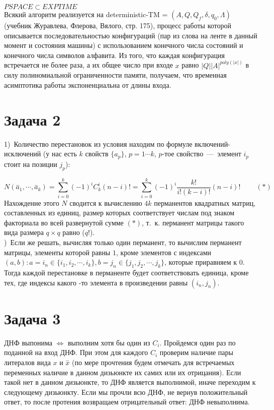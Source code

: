 \documentclass[a4paper,12pt]{article} %
\begin{document}
$PSPACE \subset EXPTIME$\\
Всякий алгоритм реализуется на deterministic-TM = $(A, Q, Q_f, \delta, q_0, \Lambda)$ (учебник Журавлева, Флерова, Вялого, стр. 175), процесс работы которой описывается последовательностью конфигураций (пар из слова на ленте в данный момент и состояния машины) с использованием конечного числа состояний и конечного числа символов алфавита. Из того, что каждая конфигурация встречается не более раза, а их общее число при входе $ x$ равно $ |Q||A|^{poly(|x|)}$ в силу полиномиальной ограниченности памяти, получаем, что временная асимптотика работы экспоненциальна от длины входа.\\

\section*{Задача 2}
1)~Количество перестановок из условия находим по формуле включений-исключений (у нас есть $k$ свойств $\{a_p\}$, $p = 1 \cdots k$, $p$-тое свойство~---~элемент $i_p$ стоит на позиции $j_p$):

\[
N(\overset{-}a_1,\cdots,\overset{-}a_k) = \sum_{i=0}^{k}{(-1)^iC_k^i(n-i)!} = \sum_{i=0}^{k}{(-1)^i\dfrac{k!}{i!(k-i)!}(n-i)! }~~~~~~~~~~(*)
\]
Нахождение этого $N$ сводится к вычислению $4k$ перманентов квадратных матриц, составленных из единиц, размер которых соответствует числам под знаком факториала во всей развернутой сумме $(*)$, т.~к. перманент матрицы такого вида размера $q\times q$ равно ($q!$).\\

)~Если же решать, вычисляя только один перманент, то вычислим перманент матрицы, элементы которой равны $1$, кроме элементов с индексами $(a, b): a = i_n \in \{i_1, i_2, \cdots, i_k\}, b = j_n \in \{j_1, j_2, \cdots, j_k\}$, которые приравняем к $0$. Тогда каждой перестановке в перманенте будет соответствовать единица, кроме тех, где индексы какого 	-то элемента в произведении равны $(i_n, j_n)$.\\

\section*{Задача 3}
ДНФ выпонима $\Leftrightarrow$ выполним хотя бы один из $C_i$. Пройдемся один раз по поданной на вход ДНФ. 
При этом для каждого $C_i$ проверим наличие пары литералов вида $x$ и $\overset{-}x$ (по мере прочтения будем отмечать для встречаемых переменных наличие в данном дизьюнкте их самих или их отрицания). Если такой нет в данном дизьюнкте, то ДНФ является выполнимой, иначе переходим к следующему дизьюнкту. Если мы прочли всю ДНФ, не вернув положительный ответ, то после протения возвращаем отрицательный ответ: ДНФ невыполнима. \\
\end{document}
